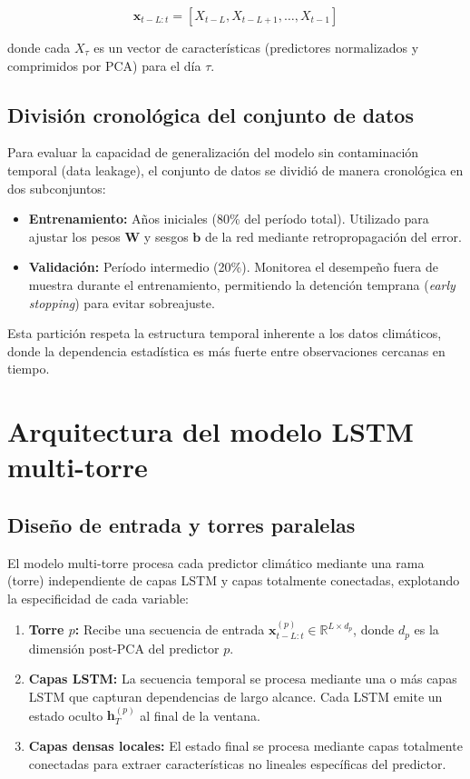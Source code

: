 \begin{equation}
    \mathbf{x}_{t-L:t} = [X_{t-L}, X_{t-L+1}, \ldots, X_{t-1}]
\end{equation}

donde cada $X_{\tau}$ es un vector de características (predictores normalizados y comprimidos por PCA) para el día $\tau$.

\subsection{División cronológica del conjunto de datos}
Para evaluar la capacidad de generalización del modelo sin contaminación temporal (data leakage), el conjunto de datos se dividió de manera cronológica en dos subconjuntos:

\begin{itemize}
    \item \textbf{Entrenamiento:} Años iniciales (80\% del período total). Utilizado para ajustar los pesos $\mathbf{W}$ y sesgos $\mathbf{b}$ de la red mediante retropropagación del error.
    \item \textbf{Validación:} Período intermedio (20\%). Monitorea el desempeño fuera de muestra durante el entrenamiento, permitiendo la detención temprana (\textit{early stopping}) para evitar sobreajuste.
\end{itemize}

Esta partición respeta la estructura temporal inherente a los datos climáticos, donde la dependencia estadística es más fuerte entre observaciones cercanas en tiempo.

\section{Arquitectura del modelo LSTM multi-torre}
\label{sec:arquitectura_lstm}

\subsection{Diseño de entrada y torres paralelas}
El modelo multi-torre procesa cada predictor climático mediante una rama (torre) independiente de capas LSTM y capas totalmente conectadas, explotando la especificidad de cada variable:

\begin{enumerate}
    \item \textbf{Torre $p$:} Recibe una secuencia de entrada $\mathbf{x}_{t-L:t}^{(p)} \in \mathbb{R}^{L \times d_p}$, donde $d_p$ es la dimensión post-PCA del predictor $p$.
    \item \textbf{Capas LSTM:} La secuencia temporal se procesa mediante una o más capas LSTM que capturan dependencias de largo alcance. Cada LSTM emite un estado oculto $\mathbf{h}_T^{(p)}$ al final de la ventana.
    \item \textbf{Capas densas locales:} El estado final se procesa mediante capas totalmente conectadas para extraer características no lineales específicas del predictor.
\end{enumerate}

